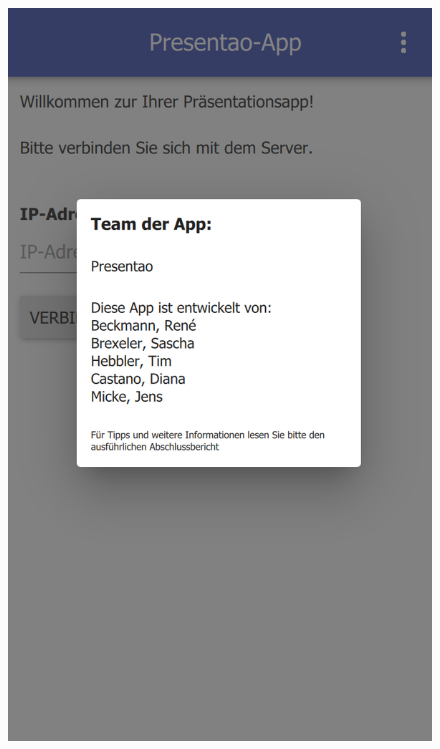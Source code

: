 \begin{figure}[ht!]
\begin{minipage}{0.31\linewidth}
		\includegraphics[scale=0.5]{GUI/Bilder/1-0-1-Startbildschirm-PopUP-Team.PNG}
	\end{minipage}
	\begin{minipage}{0.31\linewidth}
		\centering

\end{minipage}
\end{figure}
